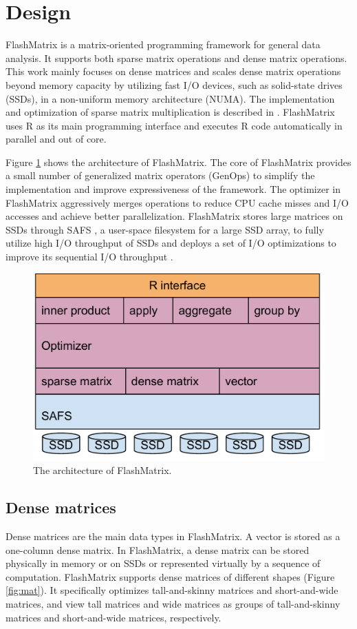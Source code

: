 \section{Design}

FlashMatrix is a matrix-oriented programming framework for general data analysis.
It supports both sparse matrix operations and dense matrix operations. This work
mainly focuses on dense matrices and scales dense matrix operations beyond
memory capacity by utilizing fast I/O devices, such as solid-state drives (SSDs),
in a non-uniform memory architecture (NUMA). The implementation and optimization
of sparse matrix multiplication is described in \cite{SEM_SpMM}.
FlashMatrix uses R as its main programming interface and executes R code
automatically in parallel and out of core.

Figure \ref{fig:arch} shows the architecture of FlashMatrix. The core of
FlashMatrix provides a small number of generalized matrix operators (GenOps)
to simplify the implementation and improve expressiveness of
the framework. The optimizer in FlashMatrix aggressively merges operations to
reduce CPU cache misses and I/O accesses and achieve better parallelization.
FlashMatrix stores large matrices on SSDs through SAFS \cite{safs},
a user-space filesystem for a large SSD array, to fully utilize high I/O
throughput of SSDs and deploys a set of I/O optimizations to improve
its sequential I/O throughput \cite{SEM_SpMM}.

\begin{figure}
\centering
\includegraphics[scale=0.3]{FlashMatrix_figs/architecture.pdf}
\caption{The architecture of FlashMatrix.}
\label{fig:arch}
\end{figure}

\subsection{Dense matrices}
Dense matrices are the main data types in FlashMatrix. A vector is stored
as a one-column dense matrix. In FlashMatrix, a dense matrix can be stored
physically in memory or on SSDs or represented virtually by a sequence of
computation. FlashMatrix supports dense matrices of different shapes
(Figure \ref{fig:mat}). It specifically optimizes tall-and-skinny matrices
and short-and-wide matrices, and view tall matrices and wide matrices
as groups of tall-and-skinny matrices and short-and-wide matrices, respectively.

